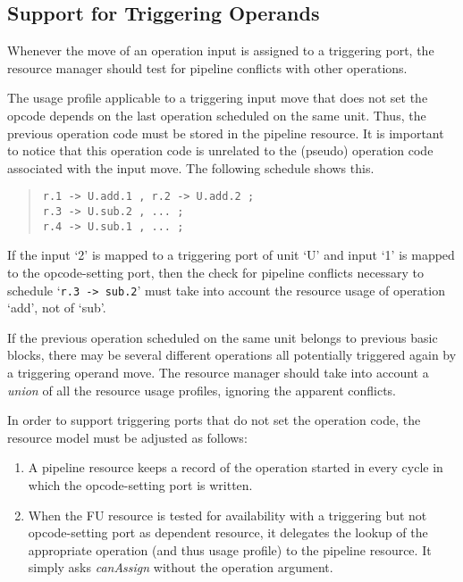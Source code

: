 \documentclass[a4paper,twoside]{tce}
\begin{document}
\subsection{Support for Triggering Operands}
\label{ssec:triggering-operands}

Whenever the move of an operation input is assigned to a triggering port,
the resource manager should test for pipeline conflicts with other
operations.

The usage profile applicable to a triggering input move that does not set
the opcode depends on the last operation scheduled on the same unit. Thus,
the previous operation code must be stored in the pipeline resource. It is
important to notice that this operation code is unrelated to the (pseudo)
operation code associated with the input move. The following schedule shows
this.
\begin{quote}
\begin{verbatim}
r.1 -> U.add.1 , r.2 -> U.add.2 ;
r.3 -> U.sub.2 , ... ;
r.4 -> U.sub.1 , ... ;
\end{verbatim}
\end{quote}
If the input `2' is mapped to a triggering port of unit `U' and input `1' is
mapped to the opcode-setting port, then the check for pipeline conflicts
necessary to schedule `\verb|r.3 -> sub.2|' must take into account the
resource usage of operation `add', not of `sub'.

If the previous operation scheduled on the same unit belongs to previous
basic blocks,
%
%
there may be several different operations all potentially triggered again by
a triggering operand move. The resource manager should take into account a
\emph{union} of all the resource usage profiles, ignoring the apparent
conflicts.

In order to support triggering ports that do not set the operation code, the
resource model must be adjusted as follows:
\begin{enumerate}
\item %
  A pipeline resource keeps a record of the operation started in every cycle
  in which the opcode-setting port is written.
\item %
  When the FU resource is tested for availability with a triggering but not
  opcode-setting port as dependent resource, it delegates the lookup of the
  appropriate operation (and thus usage profile) to the pipeline resource.
  It simply asks \emph{canAssign} without the operation argument.
\end{enumerate}
\end{document}
